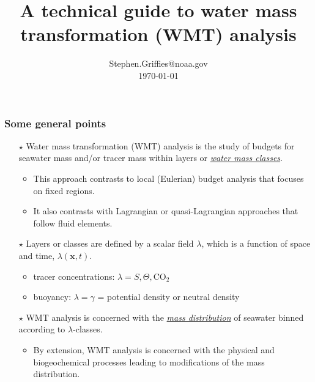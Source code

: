 \documentclass[10pt]{beamer}
\title[WMT Theory and Practice]{A technical guide to water mass transformation (WMT) analysis} %
\author[{\sc
  Stephen.M.Griffies@gmail.com}]{ {\sc Stephen.Griffies@noaa.gov} 
 \\ \vspace{.3cm} {\small  \today}
}
\institute[NOAA/GFDL + Princeton University]{NOAA/GFDL + Princeton University}
\date{}
\begin{document}

  
\begin{frame}
  \titlepage
\end{frame}






\begin{frame}
  \frametitle{Some general points}
\scriptsize 

\begin{exampleblock}{}
  
  \begin{itemize}
    
  \item[$\star$] Water mass transformation (WMT) analysis is the study
    of budgets for seawater mass and/or tracer mass within layers or \underline{\it
      water mass classes}.  

   \begin{itemize}
   \scriptsize 
   \item This approach contrasts to local (Eulerian) budget analysis
     that focuses on fixed regions.
   \item It also contrasts with Lagrangian or quasi-Lagrangian
     approaches that follow fluid elements.
   \end{itemize}

 \item[$\star$] Layers or classes are defined by a scalar field
   $\lambda$, which is a function of space and time,
   $\lambda({\bm x},t)$.
    \begin{itemize}
      \scriptsize 
     \item tracer concentrations: $\lambda = S, \Theta, \mbox{CO}_{2}$ 
     \item buoyancy: $\lambda = \gamma$ = potential density or neutral density 
    \end{itemize}
  
  \item[$\star$] WMT analysis is concerned with the \underline{\it
      mass distribution} of seawater binned according to
    $\lambda$-classes.
\begin{itemize}
      \scriptsize 
    \item By extension, WMT analysis is concerned with the physical
      and biogeochemical processes leading to modifications of the
      mass distribution.
    \end{itemize}


\end{itemize}
\end{exampleblock}
\end{frame}
\end{document}
